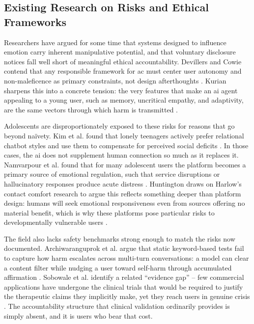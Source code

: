 \subsection{Existing Research on Risks and Ethical Frameworks}

Researchers have argued for some time that systems designed to influence emotion carry inherent manipulative potential, and that voluntary disclosure notices fall well short of meaningful ethical accountability. Devillers and Cowie contend that any responsible framework for \gls{ac} must center user autonomy and non-maleficence as primary constraints, not design afterthoughts \cite[p.~1449]{devillers_ethical_2023}. Kurian sharpens this into a concrete tension: the very features that make an \gls{ai} agent appealing to a young user, such as memory, uncritical empathy, and adaptivity, are the same vectors through which harm is transmitted \cite[p.~623]{kurian_no_2025}.

Adolescents are disproportionately exposed to these risks for reasons that go beyond na\"ivety. Kim et al. found that lonely teenagers actively prefer relational chatbot styles and use them to compensate for perceived social deficits \cite[pp.~4--5]{kim_i_2025}. In those cases, the \gls{ai} does not supplement human connection so much as it replaces it. Namvarpour et al. found that for many adolescent users the platform becomes a primary source of emotional regulation, such that service disruptions or hallucinatory responses produce acute distress \cite[p.~7]{namvarpour_understanding_2025}. Huntington draws on Harlow's contact comfort research to argue this reflects something deeper than platform design: humans will seek emotional responsiveness even from sources offering no material benefit, which is why these platforms pose particular risks to developmentally vulnerable users \cite[pp.~178--180]{huntington_ai_2025}.

The field also lacks safety benchmarks strong enough to match the risks now documented. Archiwaranguprok et al. argue that static keyword-based tests fail to capture how harm escalates across multi-turn conversations: a model can clear a content filter while nudging a user toward self-harm through accumulated affirmation \cite[p.~16]{archiwaranguprok_simulating_2025}. Sobowale et al. identify a related ``evidence gap'' -- few commercial applications have undergone the clinical trials that would be required to justify the therapeutic claims they implicitly make, yet they reach users in genuine crisis \cite[p.~2]{sobowale_evaluating_2025}. The accountability structure that clinical validation ordinarily provides is simply absent, and it is users who bear that cost.